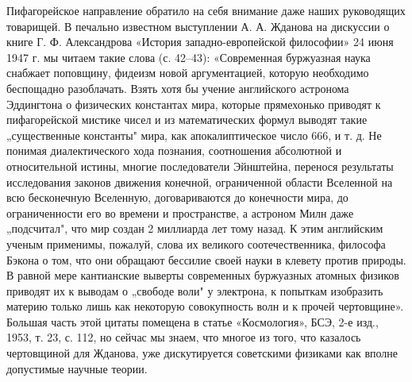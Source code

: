 Пифагорейское  направление  обратило  на   себя  внимание  даже  наших
руководящих товарищей. В печально  известном выступлении А. А. Жданова
на дискуссии  о книге Г. Ф.  Александрова «История западно-европейской
философии»  24  июня  1947  г.  мы читаем  такие  слова  (с.  42--43):
«Современная  буржуазная  наука   снабжает  поповщину,  фидеизм  новой
аргументацией, которую  необходимо беспощадно разоблачать.  Взять хотя
бы  учение английского  астронома Эддингтона  о физических  константах
мира, которые прямехонько приводят к  пифагорейской мистике чисел и из
математических формул выводят такие „существенные константы" мира, как
апокалиптическое  число  666,  и  т.  д.  Не  понимая  диалектического
хода познания,  соотношения абсолютной и относительной  истины, многие
последователи  Эйнштейна,  перенося  результаты  исследования  законов
движения конечной,  ограниченной области Вселенной на  всю бесконечную
Вселенную, договариваются до конечности мира, до ограниченности его во
времени  и пространстве,  а астроном  Милн даже  „подсчитал", что  мир
создан 2 миллиарда лет тому назад. К этим английским ученым применимы,
пожалуй, слова  их великого  соотечественника, философа Бэкона  о том,
что  они обращают  бессилие своей  науки в  клевету против  природы. В
равной мере кантианские выверты современных буржуазных атомных физиков
приводят  их  к выводам  о  „свободе  воли"  у электрона,  к  попыткам
изобразить материю  только лишь  как некоторую  совокупность волн  и к
прочей  чертовщине».  Большая  часть  этой цитаты  помещена  в  статье
«Космология»,  БСЭ, 2-е  изд.,  1953,  т. 23,  с.  112,  но сейчас  мы
знаем,  что многое  из  того, что  казалось  чертовщиной для  Жданова,
уже дискутируется  советскими физиками  как вполне  допустимые научные
теории.


